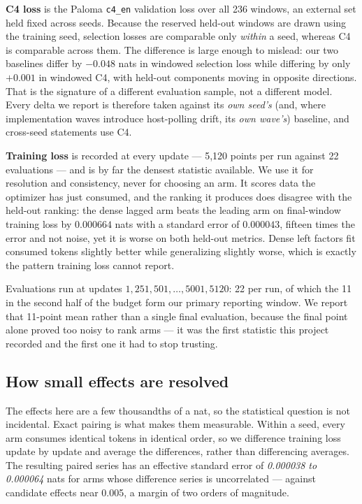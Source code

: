 \textbf{C4 loss} is the Paloma \texttt{c4\_en} validation loss over all 236
windows, an external set held fixed across seeds. Because the reserved held-out
windows are drawn using the training seed, selection losses are comparable only
\emph{within} a seed, whereas C4 is comparable across them. The difference is
large enough to mislead: our two baselines differ by $-0.048$ nats in windowed
selection loss while differing by only $+0.001$ in windowed C4, with held-out
components moving in opposite directions. That is the signature of a different
evaluation sample, not a different model. Every delta we report is therefore
taken against its \emph{own seed's} (and, where implementation waves introduce
host-polling drift, its \emph{own wave's}) baseline, and cross-seed statements
use C4.

\textbf{Training loss} is recorded at every update --- 5{,}120 points per run
against 22 evaluations --- and is by far the densest statistic available. We use
it for resolution and consistency, never for choosing an arm. It scores data the
optimizer has just consumed, and the ranking it produces does disagree with the
held-out ranking: the dense lagged arm beats the leading arm on final-window
training loss by $0.000664$ nats with a standard error of $0.000043$, fifteen
times the error and not noise, yet it is worse on both held-out metrics. Dense
left factors fit consumed tokens slightly better while generalizing slightly
worse, which is exactly the pattern training loss cannot report.

Evaluations run at updates $1,251,501,\dots,5001,5120$: 22 per run, of which the
11 in the second half of the budget form our primary reporting window. We
report that 11-point mean rather than a single final evaluation, because the
final point alone proved too noisy to rank arms --- it was the first statistic
this project recorded and the first one it had to stop trusting.

\subsection{How small effects are resolved}
\label{sec:protocol-stats}

The effects here are a few thousandths of a nat, so the statistical question is
not incidental. Exact pairing is what makes them measurable. Within a seed,
every arm consumes identical tokens in identical order, so we difference
training loss update by update and average the differences, rather than
differencing averages. The resulting paired series has an effective standard
error of \emph{0.000038 to 0.000064} nats for arms whose difference series is
uncorrelated --- against candidate effects near 0.005, a margin of two orders
of magnitude.

